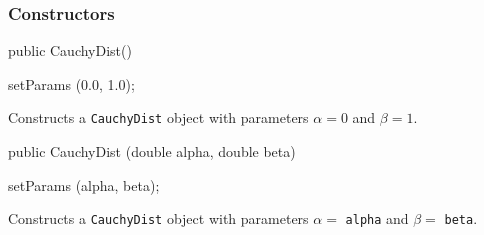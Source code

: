 \subsubsection* {Constructors}

\begin{code}

   public CauchyDist()\begin{hide} {
      setParams (0.0, 1.0);
   }\end{hide}
\end{code}
  \begin{tabb} Constructs a \texttt{CauchyDist} object
   with parameters $\alpha=0$ and $\beta=1$.
  \end{tabb}
\begin{code}

   public CauchyDist (double alpha, double beta)\begin{hide} {
      setParams (alpha, beta);
   }\end{hide}
\end{code}
 \begin{tabb} Constructs a \texttt{CauchyDist} object with parameters
   $\alpha=$ \texttt{alpha} and $\beta=$ \texttt{beta}.
 \end{tabb}

